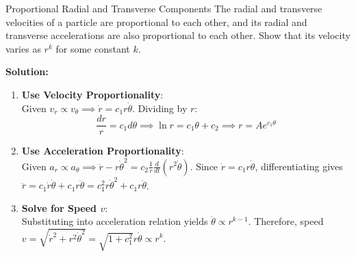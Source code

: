 \begin{examplebox}{Proportional Radial and Transverse Components}
The radial and transverse velocities of a particle are proportional to each other, and its radial and transverse accelerations are also proportional to each other. Show that its velocity varies as $r^k$ for some constant $k$.

\tcblower
\textbf{Solution:}

\begin{enumerate}[leftmargin=1.5em]
    \item \textbf{Use Velocity Proportionality}:\\
    Given $v_r \propto v_\theta \implies \dot{r} = c_1 r \dot{\theta}$.
    Dividing by $r$:
    \begin{equation*}
        \frac{dr}{r} = c_1 d\theta \implies \ln r = c_1 \theta + c_2 \implies r = A e^{c_1 \theta}
    \end{equation*}

    \item \textbf{Use Acceleration Proportionality}:\\
    Given $a_r \propto a_\theta \implies \ddot{r} - r \dot{\theta}^2 = c_2 \frac{1}{r} \frac{d}{dt}(r^2 \dot{\theta})$.
    Since $\dot{r} = c_1 r \dot{\theta}$, differentiating gives $\ddot{r} = c_1 \dot{r} \dot{\theta} + c_1 r \ddot{\theta} = c_1^2 r \dot{\theta}^2 + c_1 r \ddot{\theta}$.

    \item \textbf{Solve for Speed $v$}:\\
    Substituting into acceleration relation yields $\dot{\theta} \propto r^{k-1}$.
    Therefore, speed $v = \sqrt{\dot{r}^2 + r^2 \dot{\theta}^2} = \sqrt{1 + c_1^2} r \dot{\theta} \propto r^k$.
\end{enumerate}
\end{examplebox}

